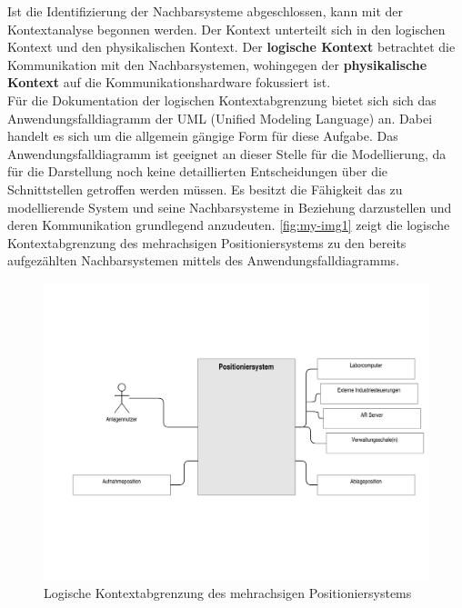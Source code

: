 \documentclass[../Bachelorarbeit.tex]{subfiles}
\begin{document}
Ist die Identifizierung der Nachbarsysteme abgeschlossen, kann mit der Kontextanalyse begonnen werden. Der Kontext unterteilt sich in den logischen Kontext und den physikalischen Kontext. Der \textbf{logische Kontext} betrachtet die Kommunikation mit den Nachbarsystemen, wohingegen der \textbf{physikalische Kontext} auf die Kommunikationshardware fokussiert ist.\\ %
Für die Dokumentation der logischen Kontextabgrenzung bietet sich sich das Anwendungsfalldiagramm der UML (Unified Modeling Language) an. Dabei handelt es sich um die allgemein gängige Form für diese Aufgabe. Das Anwendungsfalldiagramm ist geeignet an dieser Stelle für die Modellierung, da für die Darstellung noch keine detaillierten Entscheidungen über die Schnittstellen getroffen werden müssen. Es besitzt die Fähigkeit das zu modellierende System und seine Nachbarsysteme in Beziehung darzustellen und deren Kommunikation grundlegend anzudeuten. \autoref{fig:my-img1} zeigt die logische Kontextabgrenzung des mehrachsigen Positioniersystems zu den bereits aufgezählten Nachbarsystemen mittels des Anwendungsfalldiagramms.

\begin{figure}[h]
    \centering
    \includegraphics[width=\textwidth]{Images/kontextana.pdf}
    \caption[Logische Kontextabgrenzung]{Logische Kontextabgrenzung des mehrachsigen Positioniersystems}
    \label{fig:my-img1}
\end{figure}
\end{document}
